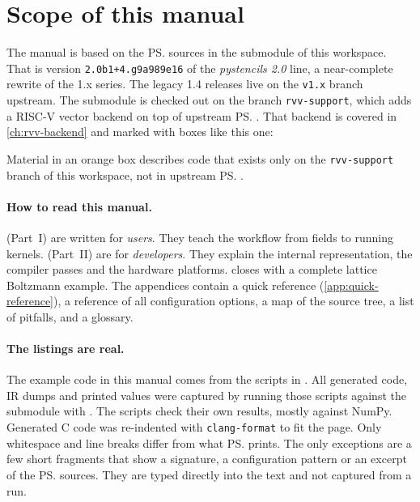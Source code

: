 \section{Scope of this manual}

The manual is based on the \ps{} sources in the  submodule
of this workspace. That is version \texttt{2.0b1+4.g9a989e16} of the \emph{pystencils
2.0} line, a near-complete rewrite of the 1.x series. The legacy 1.4 releases live on the
\texttt{v1.x} branch upstream. The submodule is checked out on the branch
\texttt{rvv-support}, which adds a RISC-V vector backend on top of upstream \ps. That
backend is covered in \cref{ch:rvv-backend} and marked with boxes like this one:

\begin{forkonly}
  Material in an orange box describes code that exists only on the \texttt{rvv-support}
  branch of this workspace, not in upstream \ps.
\end{forkonly}

\paragraph{How to read this manual.}
(Part~I) are written for \emph{users}. They teach the workflow from fields to running
kernels. 
(Part~II) are for \emph{developers}. They explain the internal representation, the
compiler passes and the hardware platforms.  closes with a
complete lattice Boltzmann example. The appendices contain a quick reference
(\cref{app:quick-reference}), a reference of all configuration options, a map of the
source tree, a list of pitfalls, and a glossary.

\paragraph{The listings are real.}
The example code in this manual comes from the scripts in
. All generated code, IR dumps and printed values
were captured by running those scripts against the submodule with
. The scripts check their own results, mostly against NumPy.
Generated C code was re-indented with \texttt{clang-format} to fit the page. Only
whitespace and line breaks differ from what \ps{} prints. The only exceptions are a few
short fragments that show a signature, a configuration pattern or an excerpt of the
\ps{} sources. They are typed directly into the text and not captured from a run.
